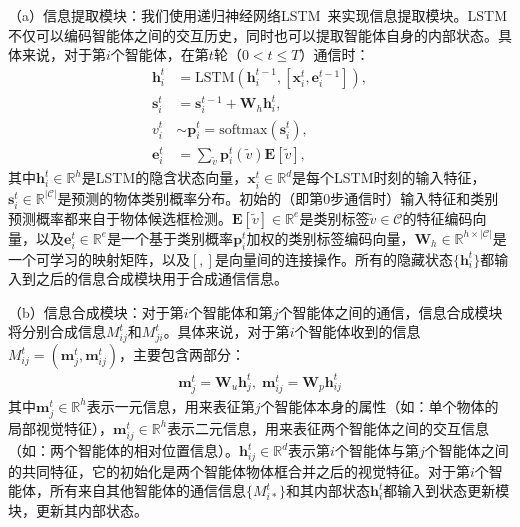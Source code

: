 （a）信息提取模块：我们使用递归神经网络LSTM~\cite{hochreiter1997long}来实现信息提取模块。LSTM不仅可以编码智能体之间的交互历史，同时也可以提取智能体自身的内部状态。具体来说，对于第$i$个智能体，在第$t$轮（$0 < t \leqslant T$）通信时：
\begin{equation}
\begin{aligned}
    \bm{h}^{t}_i & = \text{LSTM}(\bm{h}^{t-1}_i, [\bm{x}^{t}_i, \bm{e}^{t-1}_i]), \\
    \bm{s}^t_i & = \bm{s}^{t-1}_i + \bm{W}_h \bm{h}^{t}_i, \\
    v^t_i & \sim \bm{p}^{t}_i = \text{softmax}(\bm{s}^t_i), \\
    \bm{e}^{t}_i &= \textstyle{\sum_{\tilde{v}}} \bm{p}^{t}_i(\tilde{v}) \mathbf{E}[\tilde{v}],
\end{aligned}
\end{equation}
其中$\bm{h}^t_i \in \mathbb{R}^h$是LSTM的隐含状态向量，$\bm{x}^t_i \in \mathbb{R}^d$是每个LSTM时刻的输入特征，$\bm{s}^t_i \in \mathbb{R}^{|\mathcal{C}|}$是预测的物体类别概率分布。初始的（即第0步通信时）输入特征和类别预测概率都来自于物体候选框检测。$\mathbf{E}[\tilde{v}] \in \mathbb{R}^e$是类别标签$\tilde{v} \in \mathcal{C}$的特征编码向量，以及$\bm{e}^{t}_i \in \mathbb{R}^e$是一个基于类别概率$\bm{p}^t_i$加权的类别标签编码向量，$\bm{W}_h \in \mathbb{R}^{h \times |\mathcal{C}|}$是一个可学习的映射矩阵，以及$[,]$是向量间的连接操作。所有的隐藏状态$\{\bm{h}^t_i\}$都输入到之后的信息合成模块用于合成通信信息。


（b）信息合成模块：对于第$i$个智能体和第$j$个智能体之间的通信，信息合成模块将分别合成信息$M^t_{ij}$和$M^t_{ji}$。具体来说，对于第$i$个智能体收到的信息$M^t_{ij} = (\bm{m}^t_j, \bm{m}^t_{ij})$，主要包含两部分：
\begin{equation}
\begin{aligned}
\bm{m}^t_j = \bm{W}_u \bm{h}^t_j, \; \bm{m}^t_{ij} = \bm{W}_p\bm{h}^t_{ij}
\end{aligned}
\end{equation}
其中$\bm{m}^t_j \in \mathbb{R}^h$表示一元信息，用来表征第$j$个智能体本身的属性（如：单个物体的局部视觉特征），$\bm{m}^t_{ij} \in \mathbb{R}^h$表示二元信息，用来表征两个智能体之间的交互信息（如：两个智能体的相对位置信息）。$\bm{h}^t_{ij} \in \mathbb{R}^d$表示第$i$个智能体与第$j$个智能体之间的共同特征，它的初始化是两个智能体物体框合并之后的视觉特征。对于第$i$个智能体，所有来自其他智能体的通信信息$\{M^t_{i*}\}$和其内部状态$\bm{h}^t_i$都输入到状态更新模块，更新其内部状态。

